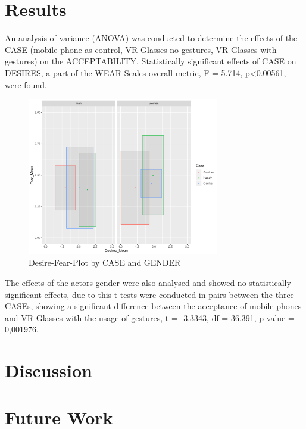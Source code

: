 \documentclass[sigchi]{acmart}
\begin{document}
\section {Results}
An analysis of variance (ANOVA) was conducted to determine the effects of the CASE (mobile phone as control, VR-Glasses no gestures, VR-Glasses with gestures)  on the ACCEPTABILITY. Statistically significant effects of CASE on DESIRES, a part of the WEAR-Scales overall metric, F = 5.714, p<0.00561, were found. 
\begin{figure}[h]
\includegraphics[width=84mm]{WEAR-figure.png} 
\caption{Desire-Fear-Plot by CASE and GENDER}
\end{figure}
The effects of the actors gender were also analysed and showed no statistically significant effects, due to this t-tests were conducted in pairs between the three CASEs, showing a significant difference between the acceptance of mobile phones and VR-Glasses with the usage of gestures, t = -3.3343, df = 36.391, p-value = 0,001976.

\section {Discussion}

\section {Future Work}




\appendix
\listoffigures
\end{document}
